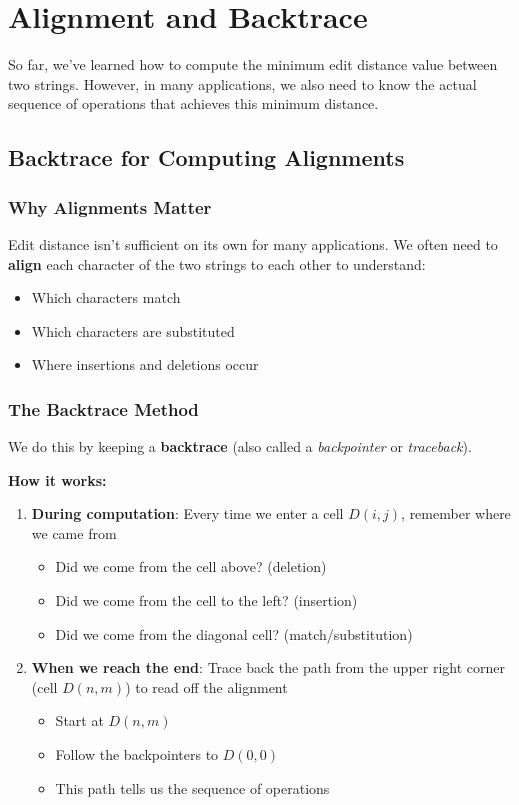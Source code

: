 \documentclass[11pt,a4paper]{article}
\theoremstyle{definition}
\theoremstyle{plain}
\theoremstyle{remark}
\begin{document}
\section{Alignment and Backtrace}

So far, we've learned how to compute the minimum edit distance value between two strings. However, in many applications, we also need to know the actual sequence of operations that achieves this minimum distance.

\subsection{Backtrace for Computing Alignments}

\subsubsection{Why Alignments Matter}

Edit distance isn't sufficient on its own for many applications. We often need to \textbf{align} each character of the two strings to each other to understand:
\begin{itemize}
    \item Which characters match
    \item Which characters are substituted
    \item Where insertions and deletions occur
\end{itemize}

\subsubsection{The Backtrace Method}

We do this by keeping a \textbf{backtrace} (also called a \textit{backpointer} or \textit{traceback}).

\textbf{How it works:}

\begin{enumerate}
    \item \textbf{During computation}: Every time we enter a cell $D(i,j)$, remember where we came from
    \begin{itemize}
        \item Did we come from the cell above? (deletion)
        \item Did we come from the cell to the left? (insertion)
        \item Did we come from the diagonal cell? (match/substitution)
    \end{itemize}
    
    \item \textbf{When we reach the end}: Trace back the path from the upper right corner (cell $D(n,m)$) to read off the alignment
    \begin{itemize}
        \item Start at $D(n,m)$
        \item Follow the backpointers to $D(0,0)$
        \item This path tells us the sequence of operations
    \end{itemize}
\end{enumerate}
\end{document}
